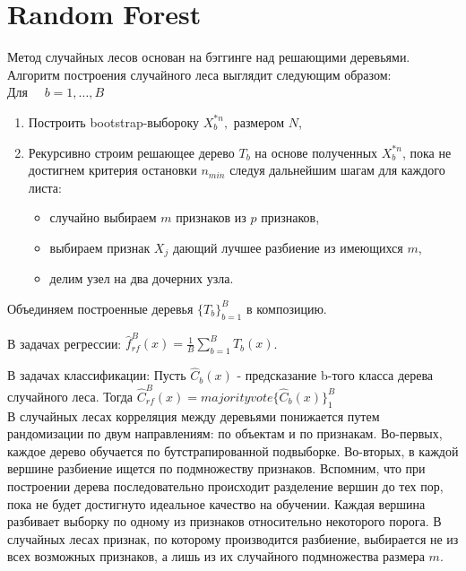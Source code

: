 \documentclass{article}
\theoremstyle{definition}
\theoremstyle{theorem}
\theoremstyle{remark}
\theoremstyle{theorem}
\theoremstyle{example}
\theoremstyle{theorem}
\theoremstyle{theorem}
\theoremstyle{theorem}
\theoremstyle{theorem}
\begin{document}
\tableofcontents

\newpage

\section{Random Forest}

Метод случайных лесов основан на бэггинге над решающими деревьями. Алгоритм построения случайного леса выглядит следующим образом:
\\

Для $ \quad b = 1, \ldots, B$

\begin{enumerate}
	\item  Построить bootstrap-выбороку $X_b^{*n},$ размером $N$,
	\item  Рекурсивно строим решающее дерево $T_b$ на основе полученных $X_b^{*n}$, пока не достигнем критерия остановки $n_{min}$ следуя дальнейшим шагам для каждого листа:
	\begin{itemize}
		\item случайно выбираем $m$ признаков из $p$ признаков,
		\item выбираем признак $X_j$ дающий лучшее разбиение из имеющихся $m$,
		\item делим узел на два дочерних узла.
	\end{itemize}
\end{enumerate}
Объединяем построенные деревья $\{T_b\}_{b=1}^B$ в композицию.

В задачах регрессии: $\hat{f}_{rf}^B(x) = \frac{1}{B}\sum\limits_{b=1}^BT_b(x)$.

В задачах классификации: Пусть $\hat{C}_{b}(x)$ - предсказание b-того класса дерева случайного леса. Тогда  $\hat{C}_{rf}^B(x) = majority vote \{\hat{C}_{b}(x)\}_1^B$
\\

В случайных лесах корреляция между деревьями понижается путем рандомизации по двум направлениям: по объектам и по признакам. Во-первых, каждое дерево обучается по бутстрапированной подвыборке. Во-вторых, в каждой вершине разбиение ищется по подмножеству признаков. Вспомним, что при построении дерева последовательно происходит разделение вершин до тех пор, пока не будет достигнуто идеальное качество на обучении. Каждая вершина разбивает выборку по одному из признаков относительно некоторого порога. В случайных лесах признак, по которому производится разбиение, выбирается не из всех возможных признаков, а лишь из их случайного подмножества размера $m$.
\end{document}
